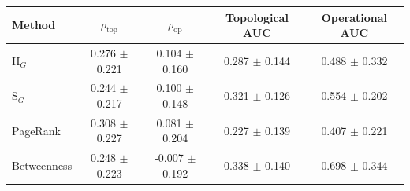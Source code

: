 \begin{tabular}{lcccc}
\toprule
Method & $\rho_{\mathrm{top}}$ & $\rho_{\mathrm{op}}$ & Topological AUC & Operational AUC \\
\midrule
H$_G$ & 0.276 $\pm$ 0.221 & 0.104 $\pm$ 0.160 & 0.287 $\pm$ 0.144 & 0.488 $\pm$ 0.332 \\
S$_G$ & 0.244 $\pm$ 0.217 & 0.100 $\pm$ 0.148 & 0.321 $\pm$ 0.126 & 0.554 $\pm$ 0.202 \\
PageRank & 0.308 $\pm$ 0.227 & 0.081 $\pm$ 0.204 & 0.227 $\pm$ 0.139 & 0.407 $\pm$ 0.221 \\
Betweenness & 0.248 $\pm$ 0.223 & -0.007 $\pm$ 0.192 & 0.338 $\pm$ 0.140 & 0.698 $\pm$ 0.344 \\
\bottomrule
\end{tabular}